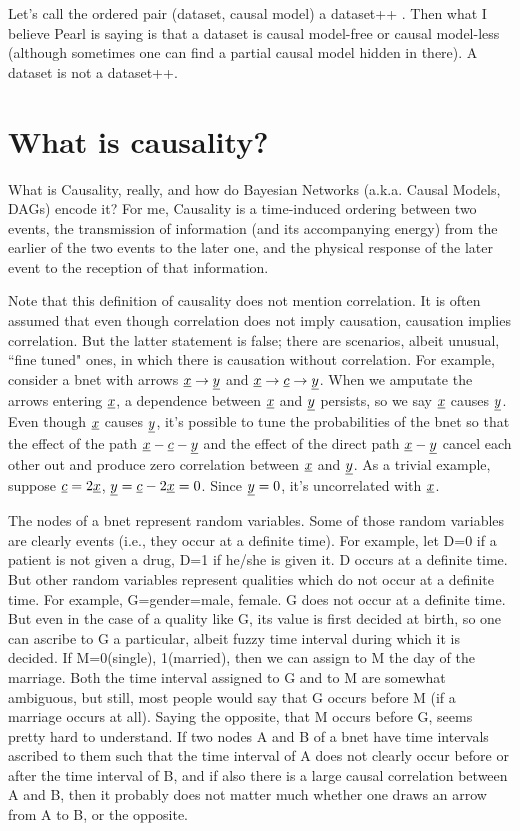 Let’s call the ordered pair
(dataset, causal model) a
dataset++ . Then what I
believe Pearl is saying is that a
dataset is causal model-free or causal model-less
(although sometimes one can find a partial
causal model hidden in there). A dataset
is not a dataset++.

\section{What is causality?}
What is Causality, really, and how do Bayesian Networks
(a.k.a. Causal Models,
DAGs) encode it?
For me, Causality is a time-induced ordering between two events, the
transmission of information (and its accompanying
energy) from the earlier of the two events to the later
one, and the physical response of the later event to the reception of that
information. 

Note that this definition
of causality does not mention
correlation.
It is often assumed that even though
correlation does not imply causation,
causation implies correlation.
But the latter statement is false; there
are scenarios, albeit  unusual,
``fine tuned" ones,
in which there is causation
without correlation.
For example, 
consider a bnet 
with arrows ${\underline{x}}\rightarrow {\underline{y}}$
and ${\underline{x}}\rightarrow {\underline{c}} \rightarrow {\underline{y}}$.
When we amputate 
the arrows entering ${\underline{x}}$,
a dependence
between ${\underline{x}}$ and ${\underline{y}}$ persists,
so we say ${\underline{x}}$ causes ${\underline{y}}$.
Even
though ${\underline{x}}$ causes ${\underline{y}}$,
it's possible to tune the 
probabilities
of the bnet so that
the effect of the path ${\underline{x}}-{\underline{c}}-{\underline{y}}$
and the effect of the direct path ${\underline{x}}-{\underline{y}}$
cancel 
each other out and
produce zero 
correlation between ${\underline{x}}$ and ${\underline{y}}$.
As a trivial example, suppose
${\underline{c}}=2{\underline{x}}$, ${\underline{y}}={\underline{c}}-2{\underline{x}}=0$.
Since ${\underline{y}}=0$, it's uncorrelated with ${\underline{x}}$.






The nodes of a bnet represent random variables. Some of those
random variables are clearly events (i.e., they occur at a definite time).
For example, let D=0 if a patient is not given a drug, D=1 if he/she is given
it. D occurs at a definite time. But other random variables represent
qualities which do not occur at a definite time. For example,
G=gender=male, female. G does not occur at a definite time.  But even in the
case of a quality like G, its value is first decided at birth, so one can
ascribe to G a particular, albeit fuzzy time interval during which it is
decided. If M=0(single), 1(married), then we can assign to M the day of the
marriage. Both the time interval assigned to G and to  M are somewhat
ambiguous, but still, most people would say that G occurs before M (if a
marriage occurs at all). Saying the opposite, that M occurs before G, seems
pretty hard to understand. If two nodes A and B of a bnet have time intervals
ascribed to them such that the time interval of A does not clearly occur
before or after the time interval of B, and if also there is a large causal
correlation between A and B, then it probably does not matter
much whether one draws an arrow from A to B, or the opposite.


